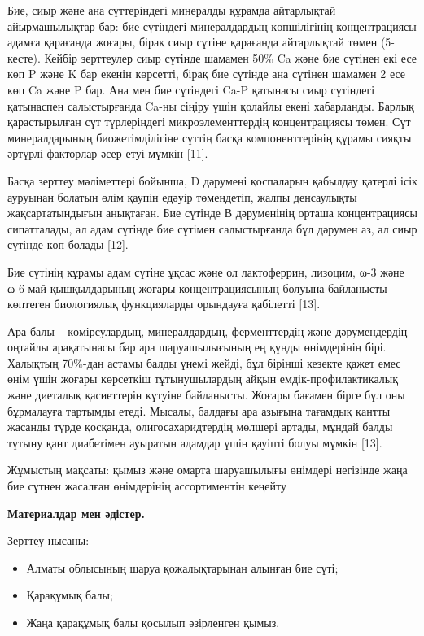 Бие, сиыр және ана сүттеріндегі минералды құрамда айтарлықтай
айырмашылықтар бар: бие сүтіндегі минералдардың көпшілігінің
концентрациясы адамға қарағанда жоғары, бірақ сиыр сүтіне қарағанда
айтарлықтай төмен (5-кесте). Кейбір зерттеулер сиыр сүтінде шамамен 50\%
Ca және бие сүтінен екі есе көп P және K бар екенін көрсетті, бірақ бие
сүтінде ана сүтінен шамамен 2 есе көп Ca және P бар. Ана мен бие
сүтіндегі Ca-P қатынасы сиыр сүтіндегі қатынаспен салыстырғанда Ca-ны
сіңіру үшін қолайлы екені хабарланды. Барлық қарастырылған сүт
түрлеріндегі микроэлементтердің концентрациясы төмен. Сүт минералдарының
биожетімділігіне сүттің басқа компоненттерінің құрамы сияқты әртүрлі
факторлар әсер етуі мүмкін {[}11{]}.

Басқа зерттеу мәліметтері бойынша, D дәрумені қоспаларын қабылдау
қатерлі ісік ауруынан болатын өлім қаупін едәуір төмендетіп, жалпы
денсаулықты жақсартатындығын анықтаған. Бие сүтінде В дәруменінің орташа
концентрациясы сипатталады, ал адам сүтінде бие сүтімен салыстырғанда
бұл дәрумен аз, ал сиыр сүтінде көп болады {[}12{]}.

Бие сүтінің құрамы адам сүтіне ұқсас және ол лактоферрин, лизоцим, ω-3
және ω-6 май қышқылдарының жоғары концентрациясының болуына байланысты
көптеген биологиялық функцияларды орындауға қабілетті {[}13{]}.

Ара балы -- көмірсулардың, минералдардың, ферменттердің және
дәрумендердің оңтайлы арақатынасы бар ара шаруашылығының ең құнды
өнімдерінің бірі. Халықтың 70\%-дан астамы балды үнемі жейді, бұл
бірінші кезекте қажет емес өнім үшін жоғары көрсеткіш тұтынушылардың
айқын емдік-профилактикалық және диеталық қасиеттерін күтуіне
байланысты. Жоғары бағамен бірге бұл оны бұрмалауға тартымды етеді.
Мысалы, балдағы ара азығына тағамдық қантты жасанды түрде қосқанда,
олигосахаридтердің мөлшері артады, мұндай балды тұтыну қант диабетімен
ауыратын адамдар үшін қауіпті болуы мүмкін {[}13{]}.

Жұмыстың мақсаты: қымыз және омарта шаруашылығы өнімдері негізінде жаңа
бие сүтнен жасалған өнімдерінің ассортиментін кеңейту

{\bfseries Материалдар мен әдістер.}

Зерттеу нысаны:

\begin{itemize}
\item
  Алматы облысының шаруа қожалықтарынан алынған бие сүті;
\item
  Қарақұмық балы;
\item
  Жаңа қарақұмық балы қосылып әзірленген қымыз.
\end{itemize}

